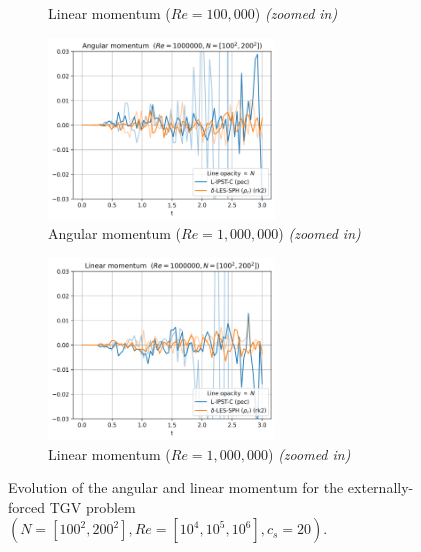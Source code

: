 \begin{figure}[htbp!]
\begin{subfigure}{7cm}
  \caption{Linear momentum ($Re = 100,000$) \textit{(zoomed in)}}
  \end{subfigure}
  \begin{subfigure}{7cm}
    \centering\includegraphics[width=6cm]{Code-Figures/ext-force-tgv/limit_am_re_1000000.png}
    \caption{Angular momentum ($Re = 1,000,000$) \textit{(zoomed in)}}
  \end{subfigure}
  \begin{subfigure}{7cm}
    \centering\includegraphics[width=6cm]{Code-Figures/ext-force-tgv/limit_lm_re_1000000.png}
    \caption{Linear momentum ($Re = 1,000,000$) \textit{(zoomed in)}}
  \end{subfigure}
  \caption{Evolution of the angular and linear momentum for the externally-forced TGV problem $(N=[100^2, 200^2], Re=[10^4, 10^5, 10^6], c_s=20)$.}
  \label{fig:tgv-forced-am-lm}
\end{figure}
